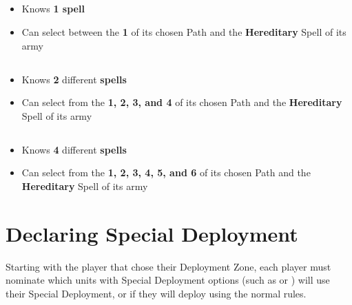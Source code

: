 \subsection{\wizardapprentice}

\begin{itemize}
\item Knows \textbf{1 spell}
\item Can select between the \learnedspell{} \textbf{1} of its chosen Path and the \textbf{Hereditary} Spell of its army
\end{itemize}

\subsection{\wizardadept}

\begin{itemize}
\item Knows \textbf{2} different \textbf{spells}
\item Can select from the \learnedspells{} \textbf{1, 2, 3, and 4} of its chosen Path and the \textbf{Hereditary} Spell of its army
\end{itemize}

\subsection{\wizardmaster}

\begin{itemize}
\item Knows \textbf{4} different \textbf{spells}
\item Can select from the \learnedspells{} \textbf{1, 2, 3, 4, 5, and 6} of its chosen Path and the \textbf{Hereditary} Spell of its army
\end{itemize}

\section{Declaring Special Deployment}
\label{declare_special_deployment}

Starting with the player that chose their Deployment Zone, each player must nominate which units with Special Deployment options (such as \hyperref[scout]{\scout{}} or \hyperref[ambush]{\ambush{}}) will use their Special Deployment, or if they will deploy using the normal rules.
